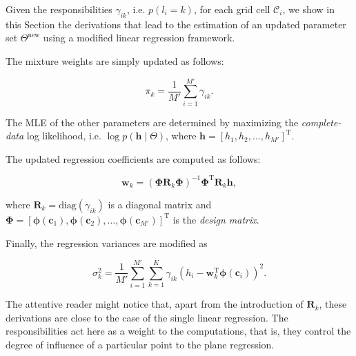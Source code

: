 Given the responsibilities $\gamma_{ik}$, i.e. $p(l_i=k)$, for each grid cell
$\mathcal{C}_i$, we show in this Section the derivations that lead to the
estimation of an updated parameter set $\Theta^\text{new}$ using a modified
linear regression framework.

The mixture weights are simply updated as follows:

\begin{equation}
\label{eqn:weights}
\pi_k = \frac{1}{M'}\sum_{i=1}^{M'}\gamma_{ik}.
\end{equation}

The MLE of the other parameters are determined by maximizing the
\emph{complete-data} log likelihood, i.e. $\log p(\mathbf{h}\mid\Theta)$, where
$\mathbf{h}=[h_1,h_2,\dots,h_{M'}]^\text{T}$.

The updated regression coefficients are computed as follows:

\begin{equation}
\label{eqn:coeff}
\mathbf{w}_k = (\boldsymbol{\Phi}\mathbf{R}_k\boldsymbol{\Phi})^{-1}
\boldsymbol{\Phi}^\text{T}\mathbf{R}_k\mathbf{h},
\end{equation}

where $\mathbf{R}_k=\text{diag}(\gamma_{ik})$ is a diagonal matrix and
$\boldsymbol{\Phi}=[\boldsymbol{\phi}(\mathbf{c}_1), \boldsymbol{\phi}
(\mathbf{c}_2),\dots,\boldsymbol{\phi}(\mathbf{c}_{M'})]^\text{T}$ is the
\emph{design matrix}.

Finally, the regression variances are modified as

\begin{equation}
\label{eqn:coeff}
\sigma^2_k = \frac{1}{M'}\sum_{i=1}^{M'}\sum_{k=1}^K \gamma_{ik}(h_i-
\mathbf{w}_k^\text{T}\boldsymbol{\phi}(\mathbf{c}_i))^2.
\end{equation}

The attentive reader might notice that, apart from the introduction of
$\mathbf{R}_k$, these derivations are close to the case of the single linear
regression. The responsibilities act here as a weight to the computations, that
is, they control the degree of influence of a particular point to the
plane regression.
